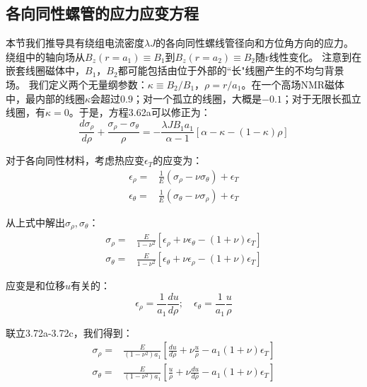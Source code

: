 \subsection{各向同性螺管的应力应变方程}
本节我们推导具有绕组电流密度$\lambda J$的各向同性螺线管径向和方位角方向的应力。
绕组中的轴向场从$B_z(r = a_1)\equiv B_1$到$B_z(r = a_2)\equiv B_2$随r线性变化。
注意到在嵌套线圈磁体中，$B_1，B_2$都可能包括由位于外部的``长"线圈产生的不均匀背景场。
我们定义两个无量纲参数：$\kappa\equiv B_2/B_1，\rho = r/a_1$。在一个高场NMR磁体中，最内部的线圈$\kappa$会超过$0.9$；对一个孤立的线圈，大概是$-0.1$；对于无限长孤立线圈，有$\kappa=0$。于是，方程3.62a可以修正为：
\begin{equation}
\frac{d\sigma_{\rho}}{d\rho}+\frac{\sigma_\rho-\sigma_\theta}{\rho}=-\frac{\lambda JB_1a_1}{\alpha-1}[\alpha-\kappa-(1-\kappa)\rho]
\end{equation}

对于各向同性材料，考虑热应变$\epsilon_T$的应变为：
\begin{subequations}
	\begin{align}
\epsilon_\rho=&\frac{1}{E}(\sigma_\rho-\nu\sigma_\theta)+\epsilon_T\\
\epsilon_\theta=&\frac{1}{E}(\sigma_\theta-\nu\sigma_\rho)+\epsilon_T
	\end{align}
\end{subequations}

从上式中解出$\sigma_\rho,\sigma_{\theta}$：
\begin{subequations}
	\begin{align}
\sigma_\rho=&\frac{E}{1-\nu^2}[\epsilon_\rho+\nu\epsilon_\theta-(1+\nu)\epsilon_T]\\
\sigma_\theta=&\frac{E}{1-\nu^2}[\epsilon_\theta+\nu\epsilon_\rho-(1+\nu)\epsilon_T]
	\end{align}
\end{subequations}

应变是和位移$u$有关的：
\begin{equation*}
\epsilon_\rho=\frac{1}{a_1}\frac{du}{d\rho};\quad \epsilon_\theta=\frac{1}{a_1}\frac{u}{\rho} \tag{3.72c}
\end{equation*}

联立3.72a-3.72c，我们得到：
\begin{align*}
\sigma_\rho=&\frac{E}{(1-\nu^2)a_1}[\frac{du}{d\rho}+\nu\frac{u}{\rho}-a_1(1+\nu)\epsilon_T]\tag{3.72d}\\ 
\sigma_\theta=&\frac{E}{(1-\nu^2)a_1}[\frac{u}{\rho}+\nu\frac{du}{d\rho}-a_1(1+\nu)\epsilon_T] \tag{3.72e}
\end{align*}

